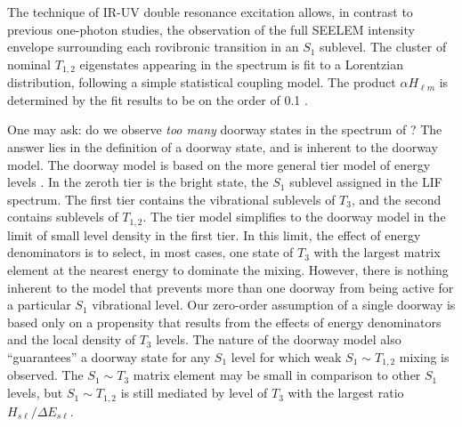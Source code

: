 The technique of IR-UV double resonance excitation allows, in contrast
to previous one-photon studies, the observation of the full SEELEM
intensity envelope surrounding each rovibronic transition in an $S_1$
sublevel.  The cluster of nominal $T_{1,2}$ eigenstates appearing in
the spectrum is fit to a Lorentzian distribution, following a simple
statistical coupling model.  The product $\alpha H_{\ell m}$ is
determined by the fit results to be on the order of 0.1 \rcm.  


One may ask: do we observe \emph{too many} doorway states in the
spectrum of ?  The answer lies in the definition of a doorway
state, and is inherent to the doorway model.  The doorway model is
based on the more general tier model of energy levels
\cite{stuchebrukhov93a, stuchebrukhov93b}.  In the zeroth tier is the
bright state, the $S_1$ sublevel assigned in the LIF spectrum.  The
first tier contains the vibrational sublevels of $T_3$, and the second
contains sublevels of $T_{1,2}$.  The tier model simplifies to the
doorway model in the limit of small level density in the first tier.
In this limit, the effect of energy denominators is to select, in most
cases, one state of $T_3$ with the largest matrix element at the
nearest energy to dominate the mixing.  However, there is nothing
inherent to the model that prevents more than one doorway from being
active for a particular $S_1$ vibrational level.  Our zero-order
assumption of a single doorway is based only on a propensity that
results from the effects of energy denominators and the local density
of $T_3$ levels.  The nature of the doorway model also ``guarantees''
a doorway state for any $S_1$ level for which weak $S_1 \sim T_{1,2}$
mixing is observed.  The $S_1 \sim T_3$ matrix element may be small in
comparison to other $S_1$ levels, but $S_1 \sim T_{1,2}$ is still
mediated by level of $T_3$ with the largest ratio
$H_{s\ell}/\Delta E_{s\ell}$.

